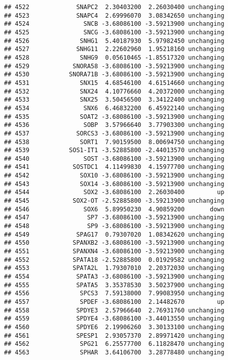 \documentclass[]{article}
\begin{document}
\begin{verbatim}
## 4522             SNAPC2  2.30403200  2.26030400 unchanging
## 4523             SNAPC4  2.69996070  3.08342650 unchanging
## 4524               SNCB -3.68086100 -3.59213900 unchanging
## 4525               SNCG -3.68086100 -3.59213900 unchanging
## 4526              SNHG1  5.40187930  5.97982450 unchanging
## 4527             SNHG11  2.22602960  1.95218160 unchanging
## 4528              SNHG9  0.05610465 -1.85517320 unchanging
## 4529            SNORA58 -3.68086100 -3.59213900 unchanging
## 4530           SNORA71B -3.68086100 -3.59213900 unchanging
## 4531              SNX15  4.68546100  4.61514660 unchanging
## 4532              SNX24  4.10776660  4.20372000 unchanging
## 4533              SNX25  3.50456500  3.34122400 unchanging
## 4534               SNX6  6.46832200  6.45922140 unchanging
## 4535              SOAT2 -3.68086100 -3.59213900 unchanging
## 4536               SOBP  3.57966640  3.77903300 unchanging
## 4537             SORCS3 -3.68086100 -3.59213900 unchanging
## 4538              SORT1  7.90159500  8.00694750 unchanging
## 4539           SOS1-IT1 -3.52885800 -2.44013570 unchanging
## 4540               SOST -3.68086100 -3.59213900 unchanging
## 4541            SOSTDC1  4.11499830  4.15977700 unchanging
## 4542              SOX10 -3.68086100 -3.59213900 unchanging
## 4543              SOX14 -3.68086100 -3.59213900 unchanging
## 4544               SOX2 -3.68086100  2.26030400         up
## 4545            SOX2-OT -2.52885800 -3.59213900 unchanging
## 4546               SOX6  5.89950230  4.90859200       down
## 4547                SP7 -3.68086100 -3.59213900 unchanging
## 4548                SP9 -3.68086100 -3.59213900 unchanging
## 4549             SPAG17  0.79307020  1.08342620 unchanging
## 4550            SPANXB2 -3.68086100 -3.59213900 unchanging
## 4551            SPANXN4 -3.68086100 -3.59213900 unchanging
## 4552            SPATA18 -2.52885800  0.01929582 unchanging
## 4553            SPATA2L  1.79307010  2.20372030 unchanging
## 4554             SPATA3 -3.68086100 -3.59213900 unchanging
## 4555             SPATA5  3.35378530  3.50237900 unchanging
## 4556              SPCS3  7.59138000  7.99083950 unchanging
## 4557              SPDEF -3.68086100  2.14482670         up
## 4558             SPDYE3  2.57966640  2.76931760 unchanging
## 4559             SPDYE4 -3.68086100 -3.44013550 unchanging
## 4560             SPDYE6  2.19906260  3.30133100 unchanging
## 4561             SPESP1  2.93057370  2.89971420 unchanging
## 4562              SPG21  6.25577700  6.11828470 unchanging
## 4563              SPHAR  3.64106700  3.28778480 unchanging

\end{verbatim}
\end{document}
